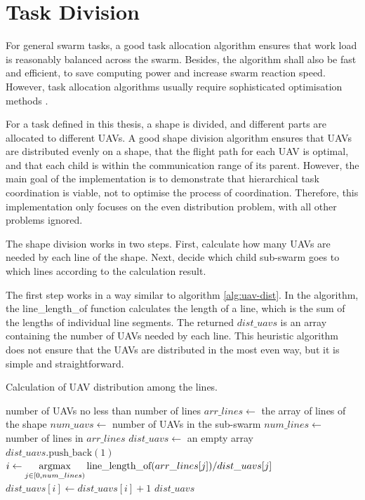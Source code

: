\section{Task Division}
\label{sec:tsk_div}

For general swarm tasks,
a good task allocation algorithm ensures that
work load is reasonably balanced across the swarm.
Besides, the algorithm shall also be fast and efficient,
to save computing power and increase swarm reaction speed.
However, task allocation algorithms usually require
sophisticated optimisation methods \parencite{Li2023, Peng2021}.

For a task defined in this thesis,
a shape is divided, and different parts are allocated to different UAVs.
A good shape division algorithm ensures that UAVs are distributed evenly on a shape,
that the flight path for each UAV is optimal,
and that each child is within the communication range of its parent.
However, the main goal of the implementation is to demonstrate that
hierarchical task coordination is viable,
not to optimise the process of coordination.
Therefore, this implementation only focuses on the even distribution problem,
with all other problems ignored.

The shape division works in two steps.
First, calculate how many UAVs are needed by each line of the shape.
Next, decide which child sub-swarm goes to which lines according to the calculation result.

The first step works in a way similar to algorithm \ref{alg:uav-dist}.
In the algorithm, the line\_length\_of function calculates the length of a line,
which is the sum of the lengths of individual line segments.
The returned $dist\_uavs$ is an array containing the number of UAVs needed by each line.
This heuristic algorithm does not ensure that
the UAVs are distributed in the most even way,
but it is simple and straightforward.

\begin{algorithm}
\caption{Calculation of UAV distribution among the lines.}
\label{alg:uav-dist}
\begin{algorithmic}[1]
\Require number of UAVs no less than number of lines
\State $arr\_lines \gets$ the array of lines of the shape
\State $num\_uavs \gets$ number of UAVs in the sub-swarm
\State $num\_lines \gets$ number of lines in $arr\_lines$
\State $dist\_uavs \gets$ an empty array
\For{$u$ in range $[0, num\_lines)$}
    \State $dist\_uavs.\text{push\_back}(1)$ 
\EndFor
\For{$u$ in range $[num\_lines, num\_uavs)$}
    \State $i \gets \displaystyle \operatorname*{argmax}_{j \in [0, num\_lines)}
        \text{line\_length\_of}(arr\_lines[j]) / dist\_uavs[j]$
    \State $dist\_uavs[i] \gets dist\_uavs[i] + 1$
\EndFor
\EndFunction
\State \Return $dist\_uavs$
\end{algorithmic}
\end{algorithm}

